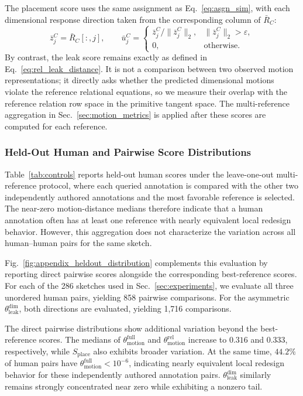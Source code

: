 The placement score uses the same assignment as Eq.~\ref{eq:asgn_sim}, with each dimensional response direction taken from the corresponding column of $\bar{R}_C$:
\begin{equation}
    \bar{z}_j^C = \bar{R}_C[:,j],
    \qquad
    \bar{u}_j^C =
    \begin{cases}
    \bar{z}_j^C/\lVert\bar{z}_j^C\rVert_2, & \lVert\bar{z}_j^C\rVert_2>\varepsilon,\\
    0, & \text{otherwise}.
    \end{cases}
    \label{eq:appendix_projected_dimension_direction}
\end{equation}
By contrast, the leak score remains exactly as defined in Eq.~\ref{eq:rel_leak_distance}. It is not a comparison between two observed motion representations; it directly asks whether the predicted dimensional motions violate the reference relational equations, so we measure their overlap with the reference relation row space in the primitive tangent space.
The multi-reference aggregation in Sec.~\ref{sec:motion_metrics} is applied after these scores are computed for each reference.

\subsubsection{Held-Out Human and Pairwise Score Distributions}
\label{sec:appendix_metric_human_distributions}
Table~\ref{tab:controls} reports held-out human scores under the leave-one-out multi-reference protocol, where each queried annotation is compared with the other two independently authored annotations and the most favorable reference is selected. The near-zero motion-distance medians therefore indicate that a human annotation often has at least one reference with nearly equivalent local redesign behavior. However, this aggregation does not characterize the variation across all human--human pairs for the same sketch.

Fig.~\ref{fig:appendix_heldout_distribution} complements this evaluation by reporting direct pairwise scores alongside the corresponding best-reference scores. For each of the 286 sketches used in Sec.~\ref{sec:experiments}, we evaluate all three unordered human pairs, yielding 858 pairwise comparisons. For the asymmetric $\theta_{\mathrm{leak}}^{\mathrm{dim}}$, both directions are evaluated, yielding 1,716 comparisons.

The direct pairwise distributions show additional variation beyond the best-reference scores. The medians of $\theta_{\mathrm{motion}}^{\mathrm{full}}$ and $\theta_{\mathrm{motion}}^{\mathrm{rel}}$ increase to $0.316$ and $0.333$, respectively, while $S_{\mathrm{place}}$ also exhibits broader variation. At the same time, $44.2\%$ of human pairs have $\theta_{\mathrm{motion}}^{\mathrm{full}}<10^{-6}$, indicating nearly equivalent local redesign behavior for these independently authored annotation pairs. $\theta_{\mathrm{leak}}^{\mathrm{dim}}$ similarly remains strongly concentrated near zero while exhibiting a nonzero tail.


